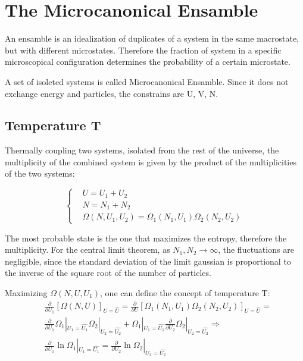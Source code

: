 \documentclass{article}
\begin{document}
\newpage

\section{The Microcanonical Ensamble}
An ensamble is an idealization of duplicates of a system in the same macrostate, but with different microstates. Therefore the fraction
of system in a specific microscopical configuration determines the probability of a certain microstate.

A set of isoleted systems is called Microcanonical Ensamble. Since it does not exchange energy and particles,
the constrains are U, V, N.

\subsection{Temperature T}
Thermally coupling two systems, isolated from the rest of the universe, the multiplicity of the combined system is given by the product of the multiplicities of the two systems:

\begin{equation*}
    \left\{
    \begin{aligned}
         & U=U_1+U_2                                               \\
         & N=N_1+N_2                                               \\
         & \Omega(N,U_1,U_2) = \Omega_1(N_1,U_1) \Omega_2(N_2,U_2)
    \end{aligned}
    \right.
\end{equation*}

The most probable state is the one that maximizes the entropy, therefore the multiplicity.
For the central limit theorem, as $N_1, N_2 \longrightarrow \infty$, the fluctuations are negligible, since the standard deviation of the limit gaussian is proportional to the inverse of the square root of the number of particles.

Maximizing $\Omega(N, U, U_1)$, one can define the concept of temperature T:
\begin{align*}
     & \frac{\partial}{\partial U_1}[\Omega(N, U)]_{U=\hat{U}} = \frac{\partial}{\partial U}[\Omega_1(N_1, U_1)\Omega_2(N_2, U_2)]_{U=\hat{U}} =                                         \\
     & \frac{\partial}{\partial U_1}\Omega_1|_{U_1=\hat{U_1}}\Omega_2|_{U_2=\hat{U_2}} + \Omega_1|_{U_1=\hat{U_1}}\frac{\partial}{\partial U_2}\Omega_2|_{U_2=\hat{U_2}} \Longrightarrow \\
     & \frac{\partial}{\partial U_1}\ln{\Omega_1}|_{U_1=\hat{U_1}}=\frac{\partial}{\partial U_2}\ln{\Omega_2}|_{U_2=\hat{U_2}}
\end{align*}
\end{document}

